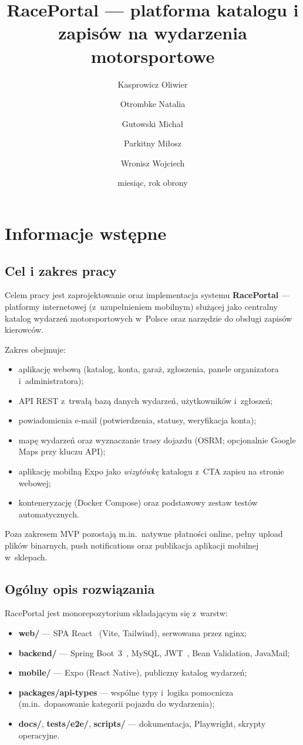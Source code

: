 \documentclass{sprz}
\title{RacePortal --- platforma katalogu i zapisów na wydarzenia motorsportowe}
\author{Kasprowicz Oliwier}{s30290}{Cyberbezpieczeństwo}{Stacjonarny}
\author{Otrombke Natalia}{s26828}{Cyberbezpieczeństwo}{Stacjonarny}
\author{Gutowski Michał}{s30572}{Cyberbezpieczeństwo}{Stacjonarny}
\author{Parkitny Miłosz}{s30287}{Cyberbezpieczeństwo}{Stacjonarny}
\author{Wronisz Wojciech}{s26999}{Cyberbezpieczeństwo}{Stacjonarny}
\date{miesiąc, rok obrony} %
\begin{document}
\maketitle

\makeprojectcard

\makedeclarationsai

\tableofcontents

\chapter{Informacje wstępne}
\section{Cel i zakres pracy}
Celem pracy jest zaprojektowanie oraz implementacja systemu \textbf{RacePortal} --- platformy internetowej (z~uzupełnieniem mobilnym) służącej jako centralny katalog wydarzeń motorsportowych w~Polsce oraz narzędzie do obsługi zapisów kierowców.

Zakres obejmuje:
\begin{itemize}
  \item aplikację webową (katalog, konta, garaż, zgłoszenia, panele organizatora i~administratora);
  \item API REST z~trwałą bazą danych wydarzeń, użytkowników i~zgłoszeń;
  \item powiadomienia e-mail (potwierdzenia, statusy, weryfikacja konta);
  \item mapę wydarzeń oraz wyznaczanie trasy dojazdu (OSRM; opcjonalnie Google Maps przy kluczu API);
  \item aplikację mobilną Expo jako \emph{wizytówkę} katalogu z~CTA zapisu na stronie webowej;
  \item konteneryzację (Docker Compose) oraz podstawowy zestaw testów automatycznych.
\end{itemize}

Poza zakresem MVP pozostają m.in.\ natywne płatności online, pełny upload plików binarnych, push notifications oraz publikacja aplikacji mobilnej w~sklepach.

\section{Ogólny opis rozwiązania}
RacePortal jest monorepozytorium składającym się z~warstw:
\begin{itemize}
  \item \textbf{web/} --- SPA React~\cite{react:docs} (Vite, Tailwind), serwowana przez nginx;
  \item \textbf{backend/} --- Spring Boot~3~\cite{spring:boot}, MySQL, JWT~\cite{jwt:rfc}, Bean Validation, JavaMail;
  \item \textbf{mobile/} --- Expo (React Native), publiczny katalog wydarzeń;
  \item \textbf{packages/api-types} --- wspólne typy i~logika pomocnicza (m.in.\ dopasowanie kategorii pojazdu do wydarzenia);
  \item \textbf{docs/}, \textbf{tests/e2e/}, \textbf{scripts/} --- dokumentacja, Playwright, skrypty operacyjne.
\end{itemize}
\end{document}
